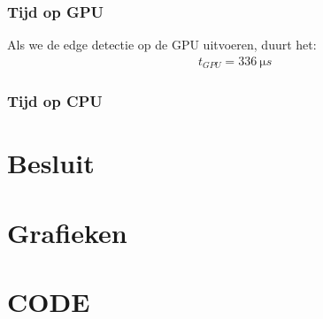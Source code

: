 \documentclass[11pt,twoside,a4paper]{article}
\begin{document}
\subsubsection{Tijd op GPU}

Als we de edge detectie op de GPU uitvoeren, duurt het:
\begin{align*}
    &t_{GPU} = \SI{336}{\micro s}
\end{align*}


\subsubsection{Tijd op CPU}



\newpage
\section{Besluit}


\newpage
\appendix
\section{Grafieken}
\label{grafieken}



\newpage
\section{CODE}
\label{code}
\inputminted[linenos=true, breaklines=true]{cuda}{main.cu}

\clearpage



\end{document}
